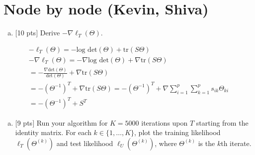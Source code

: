 \documentclass[12pt]{article}
\begin{document}

\newpage
\clearpage


\section{Node by node (Kevin, Shiva)}


\begin{enumerate}[(a)]
\item $[$10 pts$]$ Derive $-\nabla\ell_T(\Theta)$.
\end{enumerate}

\begin{align*}
-\ell_T(\Theta) = -\textrm{log det}(\Theta) + \textrm{tr}(S\Theta) \\
-\nabla\ell_T(\Theta) = -\nabla \textrm{log det}(\Theta) + \nabla \textrm{tr}(S\Theta) \\
 = -\frac{\nabla \textrm{det}(\Theta)}{\textrm{det}(\Theta)} + \nabla \textrm{tr}(S\Theta)  \\
 = -(\Theta^{-1})^{T} + \nabla \textrm{tr}(S\Theta) 
 = -(\Theta^{-1})^{T} + \nabla \sum_{i=1}^{p} \sum_{k=1}^{p} {s_{ik}\Theta_{ki}} \\
 = -(\Theta^{-1})^{T} + S^T
\end{align*}

\vspace{.25cm}

\begin{enumerate}[(d)]
\item $[$9 pts$]$  Run your algorithm for $K = 5000$ iterations upon $T$ starting from the identity matrix. For each $k \in \{1,\ldots,K\}$, plot the training likelihood $\ell_T(\Theta^{(k)})$ and test likelihood $\ell_U(\Theta^{(k)})$, where $\Theta^{(k)}$ is the $k$th iterate.
\end{enumerate}
\end{document}
